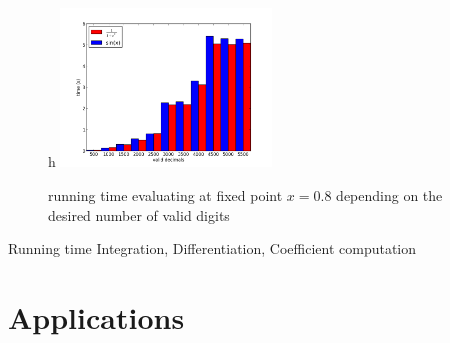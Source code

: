 		\subsection{\baana}
			\begin{figure}{h}
				\centering
				\includegraphics[width=0.5\textwidth]{img/analytic/ba_ana_dep_on_n_bar.png}
				\caption{running time evaluating \baana at fixed point $x=0.8$ depending on the desired number of valid digits}
				\label{fig:ba_ana dep on n}
			\end{figure}
			Running time Integration, Differentiation, Coefficient computation 
		\subsection{\anarect}
	\section{Applications}